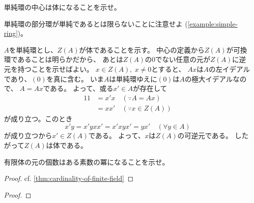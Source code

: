\documentclass[report]{jlreq}
\begin{document}
\begin{problem}[代数学II 3.46]
    単純環の中心は体になることを示せ。
\end{problem}

\begin{remark}
    単純環の部分環が単純であるとは限らないことに注意せよ (\cref{example:simple-ring})。
\end{remark}

\begin{answer}
    $A$を単純環とし、$Z(A)$が体であることを示す。
    中心の定義から$Z(A)$が可換環であることは明らかだから、
    あとは$Z(A)$の$0$でない任意の元が$Z(A)$に逆元を持つことを示せばよい。
    $x \in Z(A), \; x \neq 0$とすると、
    $Ax$は$A$の左イデアルであり、$(0)$を真に含む。
    いま$A$は単純環ゆえに$(0)$は$A$の極大イデアルなので、
    $A = Ax$である。
    よって、或る$x' \in A$が存在して
    \begin{alignat}{1}
        1 &= x' x \quad (\because A = Ax) \\
            &= x x' \quad (\because x \in Z(A))
    \end{alignat}
    が成り立つ。このとき
    \begin{equation}
        x' y = x' y x x' = x' x y x' = y x'
        \quad (\forall y \in A)
    \end{equation}
    が成り立つから$x' \in Z(A)$である。
    よって、$x$は$Z(A)$の可逆元である。
    したがって$Z(A)$は体である。
\end{answer}

\begin{problem}[代数学II 3.47]
    有限体の元の個数はある素数の冪になることを示せ。
\end{problem}

\begin{proof}
    cf. \cref{thm:cardinality-of-finite-field}
\end{proof}


\begin{proof}
    \TODO{}
\end{proof}

\end{document}
